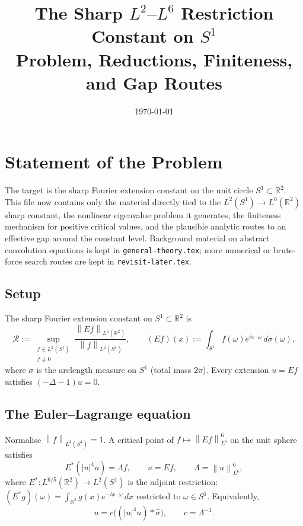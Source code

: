 \documentclass[12pt]{article}
\title{\textbf{The Sharp $L^2$--$L^6$ Restriction Constant on $S^1$}\\[0.5em]
\large Problem, Reductions, Finiteness, and Gap Routes}
\author{}
\date{\today}
\theoremstyle{definition}
\theoremstyle{remark}
\newcommand{\R}{\mathbb{R}}
\newcommand{\wh}{\widehat}
\newcommand{\norm}[1]{\left\|#1\right\|}
\begin{document}
\maketitle
\tableofcontents
\bigskip

\section{Statement of the Problem}
\label{sec:problem-statement}

The target is the sharp Fourier extension constant on the unit circle
$S^1\subset\R^2$.  This file now contains only the material directly tied
to the $L^2(S^1)\to L^6(\R^2)$ sharp constant, the nonlinear eigenvalue
problem it generates, the finiteness mechanism for positive critical
values, and the plausible analytic routes to an effective gap around the
constant level.  Background material on abstract convolution equations is
kept in \texttt{general-theory.tex}; more numerical or brute-force search
routes are kept in \texttt{revisit-later.tex}.

\subsection{Setup}

The sharp Fourier extension constant on $S^1\subset\R^2$ is
\[
  \mathcal R
  :=
  \sup_{\substack{f\in L^2(S^1)\\ f\neq 0}}
  \frac{\norm{Ef}_{L^6(\R^2)}}{\norm{f}_{L^2(S^1)}},
  \qquad
  (Ef)(x):=\int_{S^1}f(\omega)e^{ix\cdot\omega}\,d\sigma(\omega),
\]
where $\sigma$ is the arclength measure on $S^1$ (total mass $2\pi$).
Every extension $u=Ef$ satisfies $(-\Delta-1)u=0$.

\subsection{The Euler--Lagrange equation}

Normalise $\norm{f}_{L^2(S^1)}=1$.  A critical point of
$f\mapsto\norm{Ef}_{L^6}^6$ on the unit sphere satisfies
\begin{equation}  \label{eq:EL}
  E^*(|u|^4u) = \Lambda f,
  \qquad u=Ef,\qquad \Lambda=\norm{u}_{L^6}^6,
\end{equation}
where $E^*:L^{6/5}(\R^2)\to L^2(S^1)$ is the adjoint restriction:
$(E^*g)(\omega)=\int_{\R^2}g(x)e^{-ix\cdot\omega}\,dx$ restricted to
$\omega\in S^1$.  Equivalently,
\begin{equation}  \label{eq:EL-u}
  u = c\bigl((|u|^4u)\ast\wh\sigma\bigr),
  \qquad c=\Lambda^{-1}.
\end{equation}
\end{document}
